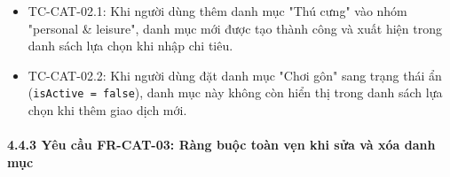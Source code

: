 \documentclass[11pt,a4paper]{article}
\providecommand{\tightlist}{
  \setlength{\itemsep}{0pt}\setlength{\parskip}{0pt}}
\begin{document}
\begin{itemize}
  \begin{itemize}
  \tightlist
  \item
    TC-CAT-02.1: Khi người dùng thêm danh mục "Thú cưng" vào nhóm
    "personal \& leisure", danh mục mới được tạo thành công và xuất hiện
    trong danh sách lựa chọn khi nhập chi tiêu.
  \item
    TC-CAT-02.2: Khi người dùng đặt danh mục "Chơi gôn" sang trạng thái
    ẩn (\texttt{isActive\ =\ false}), danh mục này không còn hiển thị
    trong danh sách lựa chọn khi thêm giao dịch mới.
  \end{itemize}
\end{itemize}

\newpage

\paragraph{4.4.3 Yêu cầu FR-CAT-03: Ràng buộc toàn vẹn khi sửa và xóa
danh
mục}\label{443-yuxeau-cux1ea7u-fr-cat-03-ruxe0ng-buux1ed9c-touxe0n-vux1eb9n-khi-sux1eeda-vuxe0-xuxf3a-danh-mux1ee5c}
\end{document}
